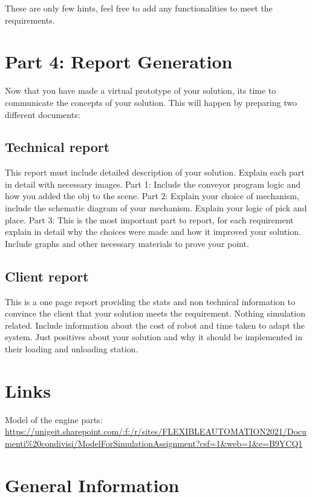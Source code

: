 \documentclass[12pt, a4paper]{article}
\begin{document}
These are only few hints, feel free to add any functionalities to meet the requirements.

\section*{Part 4: Report Generation}
Now that you have made a virtual prototype of your solution, its time to communicate the concepts of your solution. This will happen by preparing two different documents:
\subsection*{Technical report}  %
This report must include detailed description of your solution. Explain each part in detail with necessary images. Part 1: Include the conveyor program logic and how you added the obj to the scene. Part 2: Explain your choice of mechanism, include the schematic diagram of your mechanism. Explain your logic of pick and place. Part 3: This is the most important part to report, for each requirement explain in detail why the choices were made and how it improved your solution. Include graphs and other necessary materials to prove your point.
\subsection*{Client report} %
This is a one page report providing the stats and non technical information to convince the client that your solution meets the requirement. Nothing simulation related. Include information about the cost of robot and time taken to adapt the system. Just positives about your solution and why it should be implemented in their loading and unloading station.

\section*{Links}
Model of the engine parts: \\
\url{https://unigeit.sharepoint.com/:f:/r/sites/FLEXIBLEAUTOMATION2021/Documenti\%20condivisi/ModelForSimulationAssignment?csf=1&web=1&e=B9YCQ1}




\newpage
\section*{General Information}
\end{document}
